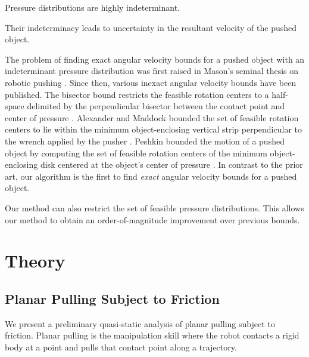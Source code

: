 \documentclass[conference]{IEEEtran}
\begin{document}
\begin{inparaenum}
\item Pressure distributions are highly indeterminant.
\item Their indeterminacy leads to uncertainty in the resultant
  velocity of the pushed object.
\item The problem of finding exact angular velocity bounds for a pushed
object with an indeterminant pressure distribution was first raised in
Mason's seminal thesis on robotic pushing \cite{Mason1982}. Since
then, various inexact angular velocity bounds have been published.
The bisector bound restricts the feasible rotation centers to a
half-space delimited by the perpendicular bisector between the contact
point and center of pressure \cite{Mason}.  Alexander and Maddock
bounded the set of feasible rotation centers to lie within the minimum
object-enclosing vertical strip perpendicular to the wrench applied by
the pusher \cite{alexander1993bounds}.  Peshkin bounded the motion of
a pushed object by computing the set of feasible rotation centers of
the minimum object-enclosing disk centered at the object's center of
pressure \cite{peshkin1988motion}.  In contrast to the prior art, our
algorithm is the first to find \textit{exact} angular velocity bounds
for a pushed object.
\item Our method can also restrict the set of feasible pressure
  distributions. This allows our method to obtain an
  order-of-magnitude improvement over previous bounds.
\end{inparaenum}

\section{Theory}\label{sec:theory}

\subsection{Planar Pulling Subject to Friction}\label{sec:planar-pulling}

We present a preliminary quasi-static analysis of planar pulling
subject to friction. Planar pulling is the manipulation skill where
the robot contacts a rigid body at a point and pulls that contact
point along a trajectory.
\end{document}
